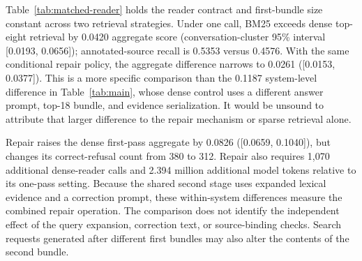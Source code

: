 \documentclass[11pt]{article}
\begin{document}
Table~\ref{tab:matched-reader} holds the reader contract and first-bundle
size constant across two retrieval strategies. Under one call, BM25 exceeds
dense top-eight retrieval by 0.0420 aggregate score (conversation-cluster
95\% interval [0.0193, 0.0656]); annotated-source recall is 0.5353 versus
0.4576. With the same conditional repair policy, the aggregate difference
narrows to 0.0261 ([0.0153, 0.0377]). This is a more specific comparison
than the 0.1187 system-level difference in Table~\ref{tab:main}, whose
dense control uses a different answer prompt, top-18 bundle, and evidence
serialization. It would be unsound to attribute that larger difference to
the repair mechanism or sparse retrieval alone.

\begin{table}[t]
\centering
\caption{Complete matched-reader ablation on 1,986 identical LoCoMo
questions. The initial bundle contains eight turns, and both selectors use
the same reader and source-binding checks. Model tokens count prompt plus
completion tokens for the answer model; dense embedding cost is excluded.}
\label{tab:matched-reader}
\small
{}
\end{table}

Repair raises the dense first-pass aggregate by 0.0826 ([0.0659, 0.1040]),
but changes its correct-refusal count from 380 to 312. Repair also requires
1,070 additional dense-reader calls and 2.394 million additional model
tokens relative to its one-pass setting. Because the shared second stage
uses expanded lexical evidence and a correction prompt, these within-system
differences measure the combined repair operation. The comparison does not
identify the independent effect of the query expansion, correction text, or
source-binding checks. Search requests generated after different first
bundles may also alter the contents of the second bundle.
\end{document}
